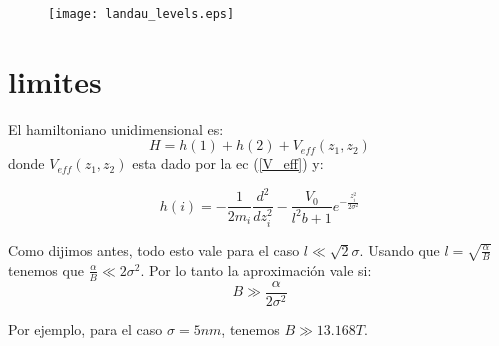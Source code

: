 \documentclass[a4paper,10pt]{article}
\begin{document}
\begin{figure}[ht]
\begin{center}
 \texttt{[image: landau\_levels.eps]}
\end{center}
\end{figure}

\section{limites}
El hamiltoniano unidimensional es:
\begin{equation}
\label{H_unidimensional}
H = h(1)+h(2)+V_{eff}(z_1,z_2)
\end{equation}
donde $V_{eff}(z_1,z_2)$ esta dado por la ec (\ref{V_eff}) y:

\begin{equation}
\label{h_1particula}
h(i) = -\frac{1}{2m_i}\frac{d^2}{dz_i^2}-\frac{V_0}{l^2 b+1}e^{-\frac{z_i^2}{2\sigma^2}}
\end{equation}

Como dijimos antes, todo esto vale para el caso $l\ll \sqrt{2}\sigma$. Usando que
$l = \sqrt{\frac{\alpha}{B}}$ tenemos que $\frac{\alpha}{B}\ll 2\sigma^2$.
Por lo tanto la aproximaci\'on vale si:
\begin{equation}
\label{condicion}
B\gg\frac{\alpha}{2\sigma^2}
\end{equation}

Por ejemplo, para el caso $\sigma = 5nm$, tenemos $B\gg 13.168 T$.


{}

\end{document}
